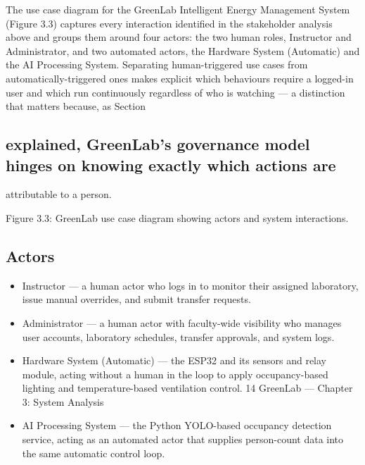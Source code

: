 The use case diagram for the GreenLab Intelligent Energy Management System (Figure 3.3)
captures every interaction identified in the stakeholder analysis above and groups them around four
actors: the two human roles, Instructor and Administrator, and two automated actors, the Hardware
System (Automatic) and the AI Processing System. Separating human-triggered use cases from
automatically-triggered ones makes explicit which behaviours require a logged-in user and which
run continuously regardless of who is watching --- a distinction that matters because, as Section
\subsection{explained, GreenLab's governance model hinges on knowing exactly which actions are}

attributable to a person.




Figure 3.3: GreenLab use case diagram showing actors and system interactions.

\subsection{Actors}

\begin{itemize}
  \item Instructor --- a human actor who logs in to monitor their assigned laboratory, issue manual
overrides, and submit transfer requests.
\end{itemize}

\begin{itemize}
  \item Administrator --- a human actor with faculty-wide visibility who manages user accounts,
laboratory schedules, transfer approvals, and system logs.
\end{itemize}

\begin{itemize}
  \item Hardware System (Automatic) --- the ESP32 and its sensors and relay module, acting
without a human in the loop to apply occupancy-based lighting and temperature-based
ventilation control.
14
GreenLab --- Chapter 3: System Analysis
\end{itemize}


\begin{itemize}
  \item AI Processing System --- the Python YOLO-based occupancy detection service, acting as
an automated actor that supplies person-count data into the same automatic control loop.
\end{itemize}

